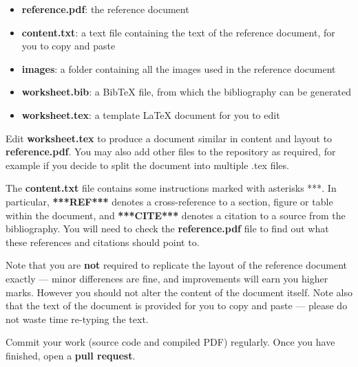 \documentclass{../../../fal_assignment}
\begin{document}
\begin{itemize}
	\item \textbf{reference.pdf}: the reference document
	\item \textbf{content.txt}: a text file containing the text of the reference document, for you to copy and paste
	\item \textbf{images}: a folder containing all the images used in the reference document
	\item \textbf{worksheet.bib}: a BibTeX file, from which the bibliography can be generated
	\item \textbf{worksheet.tex}: a template LaTeX document for you to edit
\end{itemize}

Edit \textbf{worksheet.tex} to produce a document similar in content and layout to \textbf{reference.pdf}.
You may also add other files to the repository as required, for example if you decide to split the document into multiple .tex files.

The \textbf{content.txt} file contains some instructions marked with asterisks ***.
In particular, \textbf{***REF***} denotes a cross-reference to a section, figure or table within the document,
and \textbf{***CITE***} denotes a citation to a source from the bibliography.
You will need to check the \textbf{reference.pdf} file to find out what these references and citations should point to.

Note that you are \textbf{not} required to replicate the layout of the reference document exactly --- minor differences are fine,
and improvements will earn you higher marks.
However you should not alter the content of the document itself.
Note also that the text of the document is provided for you to copy and paste --- please do not waste time re-typing the text.

Commit your work (source code and compiled PDF) regularly. Once you have finished, open a \textbf{pull request}.
\end{document}
